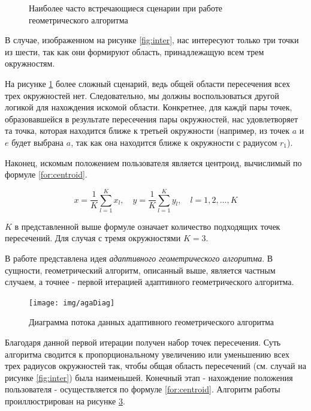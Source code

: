\begin{figure}
\begin{subfigure}[ht]{0.4\textwidth}
        \caption{}
        \label{fig:outer}
    \end{subfigure}
    \caption{Наиболее часто встречающиеся сценарии при работе геометрического алгоритма}
    \label{fig:scenarios}
\end{figure}

В случае, изображенном на рисунке \ref{fig:inter}, нас интересуют только три точки из шести, так как они формируют область, принадлежащую всем трем окружностям.

На рисунке \ref{fig:outer} более сложный сценарий, ведь общей области пересечения всех трех окружностей нет. Следовательно, мы должны воспользоваться другой логикой для нахождения искомой области. Конкретнее, для каждй пары точек, образовавшейся в результате пересечения пары окружностей, нас удовлетворяет та точка, которая находится ближе к третьей окружности (например, из точек $a$ и $e$ будет выбрана $a$, так как она находится ближе к окружности с радиусом $r_1$).

Наконец, искомым положением пользователя является центроид, вычислимый по формуле \ref{for:centroid}.
 
\begin{equation} \label{for:centroid}
    x = \frac{1}{K}\sum^K_{l=1}x_l, \quad y = \frac{1}{K}\sum^K_{l=1}y_l, \quad  l = 1,2,...,K
\end{equation}

$K$ в представленной выше формуле означает количество подходящих точек пересечений. Для случая с тремя окружностями $K=3$.

В работе \cite{brida2013novel} представлена идея \textit{адаптивного геометрического алгоритма}. В сущности, геометрический алгоритм, описанный выше, является частным случаем, а точнее - первой итерацией адаптивного геометрического алгоритма. 

\begin{figure}[ht]
    \centering
    \texttt{[image: img/agaDiag]}
    \caption{Диаграмма потока данных адаптивного геометрического алгоритма}
    \label{fig:aga}
\end{figure}

Благодаря данной первой итерации получен набор точек пересечения. Суть алгоритма сводится к пропорциональному увеличению или уменьшению всех трех радиусов окружностей так, чтобы общая область пересечений (см. случай на рисунке \ref{fig:inter}) была наименьшей. Конечный этап - нахождение положения пользователя - осуществляется по формуле \ref{for:centroid}. Алгоритм работы проиллюстрирован на рисунке \ref{fig:aga}.